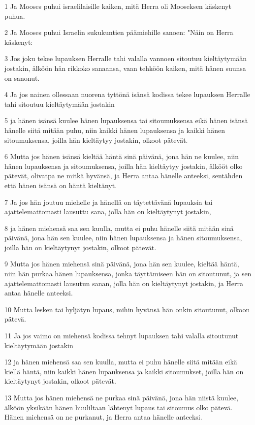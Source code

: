 \par 1 Ja Mooses puhui israelilaisille kaiken, mitä Herra oli Mooseksen käskenyt puhua.
\par 2 Ja Mooses puhui Israelin sukukuntien päämiehille sanoen: "Näin on Herra käskenyt:
\par 3 Jos joku tekee lupauksen Herralle tahi valalla vannoen sitoutuu kieltäytymään jostakin, älköön hän rikkoko sanaansa, vaan tehköön kaiken, mitä hänen suunsa on sanonut.
\par 4 Ja jos nainen ollessaan nuorena tyttönä isänsä kodissa tekee lupauksen Herralle tahi sitoutuu kieltäytymään jostakin
\par 5 ja hänen isänsä kuulee hänen lupauksensa tai sitoumuksensa eikä hänen isänsä hänelle siitä mitään puhu, niin kaikki hänen lupauksensa ja kaikki hänen sitoumuksensa, joilla hän kieltäytyy jostakin, olkoot pätevät.
\par 6 Mutta jos hänen isänsä kieltää häntä sinä päivänä, jona hän ne kuulee, niin hänen lupauksensa ja sitoumuksensa, joilla hän kieltäytyy jostakin, älkööt olko pätevät, olivatpa ne mitkä hyvänsä, ja Herra antaa hänelle anteeksi, sentähden että hänen isänsä on häntä kieltänyt.
\par 7 Ja jos hän joutuu miehelle ja hänellä on täytettävänä lupauksia tai ajattelemattomasti lausuttu sana, jolla hän on kieltäytynyt jostakin,
\par 8 ja hänen miehensä saa sen kuulla, mutta ei puhu hänelle siitä mitään sinä päivänä, jona hän sen kuulee, niin hänen lupauksensa ja hänen sitoumuksensa, joilla hän on kieltäytynyt jostakin, olkoot pätevät.
\par 9 Mutta jos hänen miehensä sinä päivänä, jona hän sen kuulee, kieltää häntä, niin hän purkaa hänen lupauksensa, jonka täyttämiseen hän on sitoutunut, ja sen ajattelemattomasti lausutun sanan, jolla hän on kieltäytynyt jostakin, ja Herra antaa hänelle anteeksi.
\par 10 Mutta lesken tai hyljätyn lupaus, mihin hyvänsä hän onkin sitoutunut, olkoon pätevä.
\par 11 Ja jos vaimo on miehensä kodissa tehnyt lupauksen tahi valalla sitoutunut kieltäytymään jostakin
\par 12 ja hänen miehensä saa sen kuulla, mutta ei puhu hänelle siitä mitään eikä kiellä häntä, niin kaikki hänen lupauksensa ja kaikki sitoumukset, joilla hän on kieltäytynyt jostakin, olkoot pätevät.
\par 13 Mutta jos hänen miehensä ne purkaa sinä päivänä, jona hän niistä kuulee, älköön yksikään hänen huuliltaan lähtenyt lupaus tai sitoumus olko pätevä. Hänen miehensä on ne purkanut, ja Herra antaa hänelle anteeksi.
